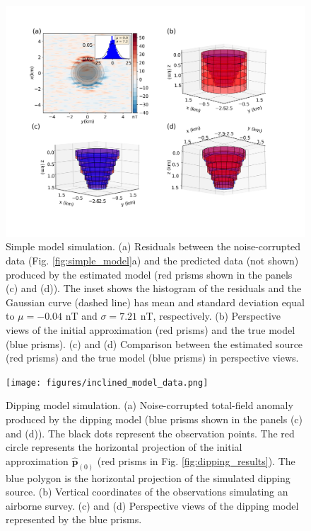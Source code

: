 \begin{figure}
	\centering
	\includegraphics[width=\linewidth]{figures/simple_results.png}
	\caption{Simple model simulation. (a) Residuals between the  noise-corrupted data (Fig. \ref{fig:simple_model}a) and the predicted data (not shown) produced by the estimated model (red prisms shown in the panels (c) and (d)). The inset shows the histogram of the residuals and the Gaussian curve (dashed line) has mean and standard deviation equal to $\mu = -0.04$ nT and $\sigma=7.21$ nT, respectively. (b) Perspective views of the initial approximation (red prisms) and the true model (blue prisms). (c) and (d) Comparison between the estimated source (red prisms) and the true model (blue prisms) in perspective views.}
	\label{fig:simple_results}
\end{figure}


\begin{figure}
    \centering
    \texttt{[image: figures/inclined\_model\_data.png]}
    \caption{Dipping model simulation. (a) Noise-corrupted total-field anomaly produced by the dipping model (blue prisms shown in the panels (c) and (d)). The black dots represent the observation points. The red circle represents the horizontal projection 
   	of the initial approximation $\hat{\mathbf{p}}_{(0)}$ 
   	(red prisms in Fig. \ref{fig:dipping_results}). The blue polygon is the horizontal projection of the simulated dipping source.
   	(b) Vertical coordinates of the observations simulating an airborne survey. (c) and (d) Perspective views of the dipping model represented by the blue prisms.
}
    \label{fig:dipping_model}
\end{figure}

